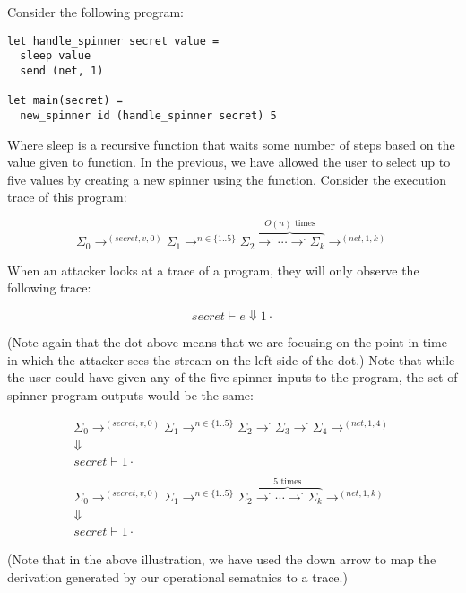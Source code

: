 \documentclass[conference]{IEEEtran}
\newcommand{\code}[1]{\text{\lstinline!#1!}}
\theoremstyle{definition}
\newcommand{\judge}{\vdash}
\begin{document}
Consider the following program:

\begin{lstlisting}
let handle_spinner secret value = 
  sleep value
  send (net, 1)

let main(secret) =
  new_spinner id (handle_spinner secret) 5
\end{lstlisting}

Where sleep is a recursive function that waits some number of steps
based on the value given to function.  In the previous, we have
allowed the user to select up to five values by creating a new spinner
using the \code{new_spinner} function.  Consider the execution trace
of this program:

\[
\Sigma_0 \rightarrow^{(secret,v,0)} \Sigma_1 \rightarrow^{n \in
  \{1..5\}} \Sigma_2 \overbrace{ \rightarrow^\cdot \cdots
  \rightarrow^\cdot \Sigma_k}^\text{$O(n)$ times}
\rightarrow^{(net,1,k)}
\]

When an attacker looks at a trace of a program, they will only observe
the following trace:

\[
secret \judge e \Downarrow 1 \cdot
\]

(Note again that the dot above means that we are focusing on the point
in time in which the attacker sees the stream on the left side of the
dot.)  Note that while the user could have given any of the five
spinner inputs to the program, the set of spinner program outputs
would be the same:

\begin{displaymath}
\begin{array}{c}
\Sigma_0 \rightarrow^{(secret,v,0)} \Sigma_1 \rightarrow^{n \in
  \{1..5\}} \Sigma_2 \rightarrow^\cdot \Sigma_3 \rightarrow^\cdot \Sigma_4
\rightarrow^{(net,1,4)} \\ 
\Downarrow \\ 
secret \judge 1 \cdot \\ \\ 

\Sigma_0 \rightarrow^{(secret,v,0)} \Sigma_1 \rightarrow^{n \in
  \{1..5\}} \Sigma_2 \overbrace{ \rightarrow^\cdot \cdots
  \rightarrow^\cdot \Sigma_k}^\text{5 times}
\rightarrow^{(net,1,k)} \\ 
\Downarrow \\ 
secret \judge 1 \cdot
\end{array}
\end{displaymath}

(Note that in the above illustration, we have used the down arrow to
map the derivation generated by our operational sematnics to a trace.)
\end{document}
